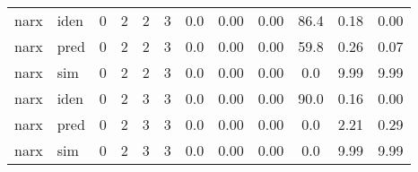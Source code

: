 \begin{landscape}
\begin{center}
\begin{longtable}{ll|cccc|ccc|ccc}
 \hline 
narx & iden & 0 & 2 & 2 & 3 & 0.0 & 0.00 & 0.00 & 86.4 & 0.18 & 0.00 \\ 
narx & pred & 0 & 2 & 2 & 3 & 0.0 & 0.00 & 0.00 & 59.8 & 0.26 & 0.07 \\ 
narx & sim & 0 & 2 & 2 & 3 & 0.0 & 0.00 & 0.00 & 0.0 & 9.99 & 9.99 \\ 
 \hline 
narx & iden & 0 & 2 & 3 & 3 & 0.0 & 0.00 & 0.00 & 90.0 & 0.16 & 0.00 \\ 
narx & pred & 0 & 2 & 3 & 3 & 0.0 & 0.00 & 0.00 & 0.0 & 2.21 & 0.29 \\ 
narx & sim & 0 & 2 & 3 & 3 & 0.0 & 0.00 & 0.00 & 0.0 & 9.99 & 9.99 \\ 
 \hline 
\end{longtable} 
\normalsize
\end{center}
\end{landscape}